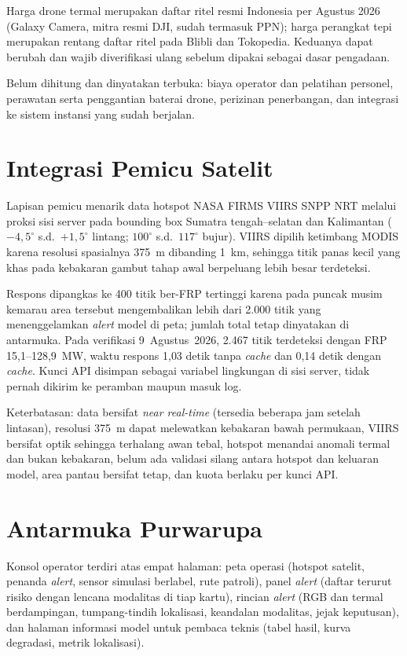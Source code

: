 Harga drone termal merupakan daftar ritel resmi Indonesia per Agustus 2026
(Galaxy Camera, mitra resmi DJI, sudah termasuk PPN); harga perangkat tepi
merupakan rentang daftar ritel pada Blibli dan Tokopedia. Keduanya dapat berubah
dan wajib diverifikasi ulang sebelum dipakai sebagai dasar pengadaan.

Belum dihitung dan dinyatakan terbuka: biaya operator dan pelatihan personel,
perawatan serta penggantian baterai drone, perizinan penerbangan, dan integrasi
ke sistem instansi yang sudah berjalan.

\section{Integrasi Pemicu Satelit}
\label{app:firms}

Lapisan pemicu menarik data hotspot NASA FIRMS VIIRS SNPP NRT melalui proksi
sisi server pada bounding box Sumatra tengah--selatan dan Kalimantan
($-4{,}5^\circ$ s.d.\ $+1{,}5^\circ$ lintang; $100^\circ$ s.d.\ $117^\circ$
bujur). VIIRS dipilih ketimbang MODIS karena resolusi spasialnya 375~m
dibanding 1~km, sehingga titik panas kecil yang khas pada kebakaran gambut
tahap awal berpeluang lebih besar terdeteksi.

Respons dipangkas ke 400 titik ber-FRP tertinggi karena pada puncak musim
kemarau area tersebut mengembalikan lebih dari 2.000 titik yang menenggelamkan
\emph{alert} model di peta; jumlah total tetap dinyatakan di antarmuka. Pada
verifikasi 9~Agustus~2026, 2.467 titik terdeteksi dengan FRP 15{,}1--128{,}9~MW,
waktu respons 1{,}03 detik tanpa \emph{cache} dan 0{,}14 detik dengan
\emph{cache}. Kunci API disimpan sebagai variabel lingkungan di sisi server,
tidak pernah dikirim ke peramban maupun masuk log.

Keterbatasan: data bersifat \emph{near real-time} (tersedia beberapa jam setelah
lintasan), resolusi 375~m dapat melewatkan kebakaran bawah permukaan, VIIRS
bersifat optik sehingga terhalang awan tebal, hotspot menandai anomali termal
dan bukan kebakaran, belum ada validasi silang antara hotspot dan keluaran
model, area pantau bersifat tetap, dan kuota berlaku per kunci API.

\section{Antarmuka Purwarupa}
\label{app:antarmuka}

Konsol operator terdiri atas empat halaman: peta operasi (hotspot satelit,
penanda \emph{alert}, sensor simulasi berlabel, rute patroli), panel
\emph{alert} (daftar terurut risiko dengan lencana modalitas di tiap kartu),
rincian \emph{alert} (RGB dan termal berdampingan, tumpang-tindih lokalisasi,
keandalan modalitas, jejak keputusan), dan halaman informasi model untuk
pembaca teknis (tabel hasil, kurva degradasi, metrik lokalisasi).

